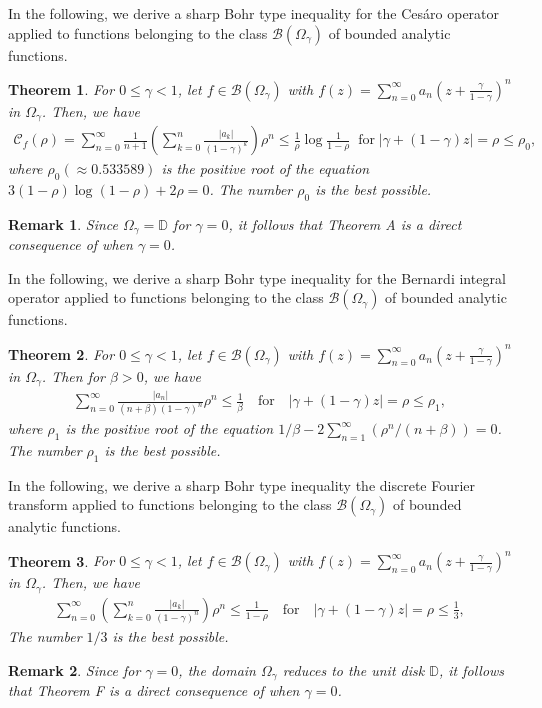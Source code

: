 \documentclass[11pt,reqno]{amsart}
\newtheorem{theo}{Theorem}[section]
\newtheorem{rem}{Remark}[section]
\newtheorem{open problem}{Open problem}[section]
\newcommand{\beas}{\begin{eqnarray*}}
\newcommand{\eeas}{\end{eqnarray*}}
\numberwithin{equation}{section}
\begin{document}
In the following, we derive a sharp Bohr type inequality for the Ces\'aro operator applied to functions belonging to the class $\mathcal{B}(\Omega_{\gamma})$ of bounded analytic functions.
\begin{theo}\label{Th1}
For $0\leq \gamma<1$, let  $f\in\mathcal{B}(\Omega_{\gamma})$ with $f(z)=\sum_{n=0}^\infty a_n\left(z+\frac{\gamma}{1-\gamma}\right)^n$ in $\Omega_{\gamma}$. Then, we have 
\beas \mathcal{C}_f(\rho)=\sum_{n=0}^\infty \frac{1}{n+1}\left(\sum_{k=0}^n\frac{|a_k|}{(1-\gamma)^k}\right) \rho^n\leq \frac{1}{\rho}\log\frac{1}{1-\rho}\;\;\text{for}\;|\gamma+(1-\gamma)z|=\rho\leq \rho_0,\eeas
where $\rho_0(\approx 0.533589)$ is the positive root of the equation $3(1-\rho)\log(1-\rho)+2\rho=0$. The number $\rho_0$ is the best possible.
\end{theo}
\begin{rem}
Since $\Omega_{\gamma}=\mathbb{D}$ for $\gamma=0$, it follows that \textrm{Theorem A} is a direct consequence of  when $\gamma=0$.\end{rem}
In the following, we derive a sharp Bohr type inequality for the Bernardi integral operator applied to functions belonging to the class $\mathcal{B}(\Omega_{\gamma})$ of bounded analytic functions.
\begin{theo}\label{Th2}
For $0\leq \gamma<1$, let  $f\in\mathcal{B}(\Omega_{\gamma})$ with $f(z)=\sum_{n=0}^\infty a_n\left(z+\frac{\gamma}{1-\gamma}\right)^n$ in $\Omega_{\gamma}$. Then for $\beta>0$, we have 
\beas \sum_{n=0}^\infty \frac{|a_n|}{(n+\beta)(1-\gamma)^n}\rho^n\leq \frac{1}{\beta}\quad\text{for}\quad|\gamma+(1-\gamma)z|=\rho\leq \rho_1,\eeas
where $\rho_1$ is the positive root of the equation $1/\beta - 2\sum_{n=1}^\infty\left( \rho^n/(n+\beta)\right)=0$. The number $\rho_1$ is the best possible.
\end{theo}
In the following, we derive a sharp Bohr type inequality the discrete Fourier transform applied to functions belonging to the class $\mathcal{B}(\Omega_{\gamma})$ of bounded analytic functions.
\begin{theo}\label{Th3}
For $0\leq \gamma<1$, let  $f\in\mathcal{B}(\Omega_{\gamma})$ with $f(z)=\sum_{n=0}^\infty a_n\left(z+\frac{\gamma}{1-\gamma}\right)^n$ in $\Omega_{\gamma}$. Then, we have 
\beas\sum_{n=0}^\infty \left(\sum_{k=0}^n \frac{|a_k|}{(1-\gamma)^n}\right) \rho^n\leq \frac{1}{1-\rho}\quad\text{for}\quad |\gamma+(1-\gamma)z|=\rho\leq \frac{1}{3},\eeas
The number $1/3$ is the best possible.\end{theo}
\begin{rem} Since for $\gamma=0$, the domain $\Omega_{\gamma}$ reduces to the unit disk $\mathbb{D}$, it follows that \textrm{Theorem F} is a direct consequence of  when $\gamma=0$.\end{rem}
\end{document}
